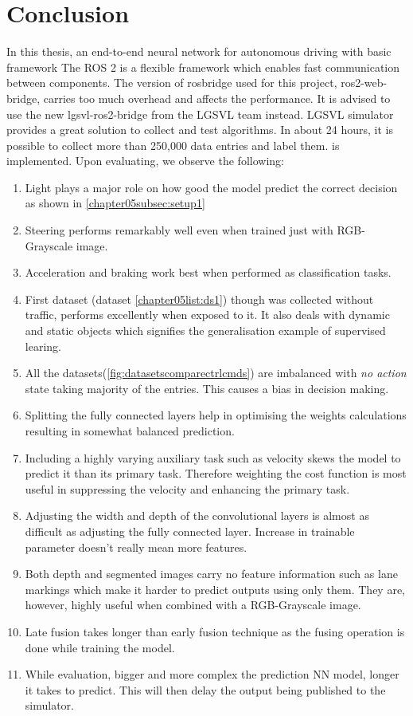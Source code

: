 \chapter{Conclusion}

In this thesis, an end-to-end neural network for autonomous driving with basic framework
The ROS 2 is a flexible framework which enables fast communication between components. The version of rosbridge used for this project, ros2-web-bridge, carries too much overhead and affects the performance. It is advised to use the new lgsvl-ros2-bridge from the LGSVL team instead.
LGSVL simulator provides a great solution to collect and test algorithms. In about 24 hours, it is possible to collect more than 250,000 data entries and label them.
is implemented. Upon evaluating, we observe the following:
\begin{enumerate}
    \item Light plays a major role on how good the model predict the correct decision as
        shown in \ref{chapter05subsec:setup1}
    \item Steering performs remarkably well even when trained just with RGB-Grayscale image.
    \item Acceleration and braking work best when performed as classification tasks.
    \item First dataset (dataset \ref{chapter05list:ds1}) though was collected without traffic,
        performs excellently when exposed to it. It also deals with dynamic and static objects which signifies the generalisation example of supervised learing.
    \item All the datasets(\ref{fig:datasetscomparectrlcmds}) are imbalanced with
        \textit{no action} state taking majority of the entries. This causes a bias in
        decision making.
    \item Splitting the fully connected layers help in optimising the weights calculations
        resulting in somewhat balanced prediction.
    \item Including a highly varying auxiliary task such as velocity skews the model to
        predict it than its primary task. Therefore weighting the cost function is most
        useful in suppressing the velocity and enhancing the primary task.
    \item Adjusting the width and depth of the convolutional layers is almost as difficult
        as adjusting the fully connected layer. Increase in trainable parameter doesn't
        really mean more features.
    \item Both depth and segmented images carry no feature information such as lane
        markings which make it harder to predict outputs using only them. They are,
        however, highly useful when combined with a RGB-Grayscale image.
    \item Late fusion takes longer than early fusion technique as the fusing operation is
        done while training the model.
    \item While evaluation, bigger and more complex the prediction NN model, longer it
        takes to predict. This will then delay the output being published to the
        simulator.
\end{enumerate}

